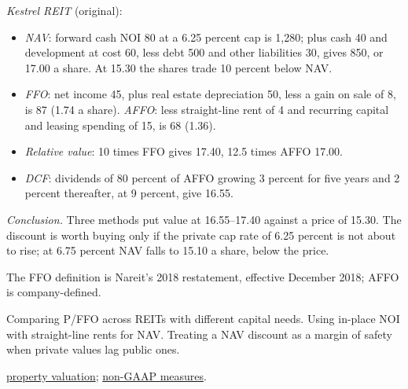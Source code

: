 \begin{qfmethod}
 \emph{Kestrel REIT} (original):
\begin{itemize}
\item \emph{NAV}: forward cash NOI 80 at a 6.25 percent cap is 1,280; plus cash 40 and development at cost 60, less debt 500 and other liabilities 30, gives 850, or 17.00 a share. At 15.30 the shares trade 10 percent below NAV.
\item \emph{FFO}: net income 45, plus real estate depreciation 50, less a gain on sale of 8, is 87 (1.74 a share). \emph{AFFO}: less straight-line rent of 4 and recurring capital and leasing spending of 15, is 68 (1.36).
\item \emph{Relative value}: 10 times FFO gives 17.40, 12.5 times AFFO 17.00.
\item \emph{DCF}: dividends of 80 percent of AFFO growing 3 percent for five years and 2 percent thereafter, at 9 percent, give 16.55.
\end{itemize}
\emph{Conclusion.} Three methods put value at 16.55--17.40 against a price of 15.30. The discount is worth buying only if the private cap rate of 6.25 percent is not about to rise; at 6.75 percent NAV falls to 15.10 a share, below the price.

 The FFO definition is Nareit's 2018 restatement, effective December 2018; AFFO is company-defined.

 Comparing P/FFO across REITs with different capital needs. Using in-place NOI with straight-line rents for NAV. Treating a NAV discount as a margin of safety when private values lag public ones.

 \hyperref[meth:real-estate-valuation-indexes]{property valuation}; \hyperref[meth:earnings-management-presentation]{non-GAAP measures}.

\end{qfmethod}

